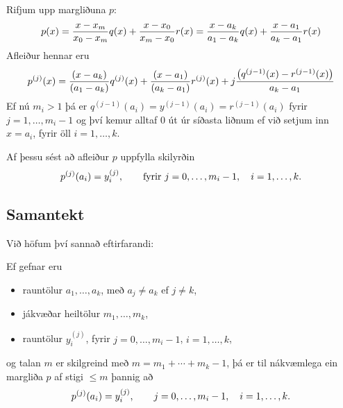 \documentclass[letterpaper,10pt,icelandic]{sphinxmanual}
\begin{document}
Rifjum upp margliðuna \(p\):
\begin{gather}
\begin{split}p(x) = \frac{x-x_m}{x_0-x_m}q(x)
  + \frac{x-x_0}{x_m-x_0}r(x)
  = \frac{x-a_k}{a_1-a_k}q(x)
  + \frac{x-a_1}{a_k-a_1}r(x)\end{split}\notag
\end{gather}
Afleiður hennar eru
\begin{gather}
\begin{split}p^{(j)}(x) = \frac{(x-a_k)}{(a_1-a_k)}q^{(j)}(x)
  + \frac{(x-a_1)}{(a_k-a_1)}r^{(j)}(x)
  + j \frac{\left( q^{(j-1)}(x)-r^{(j-1)}(x)\right)}{a_k-a_1}\end{split}\notag
\end{gather}
Ef nú \(m_i > 1\) þá er \(q^{(j-1)}(a_i) = y^{(j-1)}(a_i) =
r^{(j-1)}(a_i)\) fyrir \(j = 1, \ldots, m_i-1\) og því kemur alltaf
\(0\) út úr síðasta liðnum ef við setjum inn \(x = a_i\), fyrir
öll \(i = 1, \ldots, k\).

Af þessu sést að afleiður \(p\) uppfylla skilyrðin
\begin{gather}
\begin{split}p^{(j)}(a_i) = y^{(j)}_i, \qquad \text{fyrir } j=0,\ldots,m_i-1,
  \quad i=1,\ldots,k.\end{split}\notag
\end{gather}

\subsection{Samantekt}
\label{kafli03:id4}
Við höfum því sannað eftirfarandi:

Ef gefnar eru
\begin{itemize}
\item {} 
rauntölur \(a_1,\dots,a_k\), með \(a_j\neq a_k\) ef
\(j\neq k\),

\item {} 
jákvæðar heiltölur \(m_1,\dots,m_k\),

\item {} 
rauntölur \(y_i^{(j)}\), fyrir \(j=0,\dots, m_i-1\),
\(i=1,\dots,k\),

\end{itemize}

og talan \(m\) er skilgreind með \(m=m_1+\cdots+m_k-1\), þá er
til nákvæmlega ein margliða \(p\) af stigi \(\leq m\) þannig að
\begin{gather}
\begin{split}p^{(j)}(a_i)=y_i^{(j)}, \qquad j=0,\dots, m_i-1, \quad i=1,\dots,k.\end{split}\notag
\end{gather}
\end{document}
